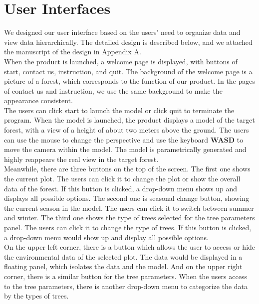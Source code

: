 \documentclass[12pt, titlepage]{article}
\begin{document}
\section{User Interfaces}


We designed our user interface based on the users' need to organize data and view data hierarchically. The detailed design is described below, and we attached the manuscript of the design in Appendix A.\\

\noindent When the product is launched, a welcome page is displayed, with buttons of start, contact us, instruction, and quit. The background of the welcome page is a picture of a forest, which corresponds to the function of our product. In the pages of contact us and instruction, we use the same background to make the appearance consistent. \\

\noindent The users can click start to launch the model or click quit to terminate the program. When the model is launched, the product displays a model of the target forest, with a view of a height of about two meters above the ground. The users can use the mouse to change the perspective and use the keyboard \textbf{WASD} to move the camera within the model. The model is parametrically generated and highly reappears the real view in the target forest. \\

\noindent Meanwhile, there are three buttons on the top of the screen. The first one shows the current plot. The users can click it to change the plot or show the overall data of the forest. If this button is clicked, a drop-down menu shows up and displays all possible options. The second one is seasonal change button, showing the current season in the model. The users can click it to switch between summer and winter. The third one shows the type of trees selected for the tree parameters panel. The users can click it to change the type of trees. If this button is clicked, a drop-down menu would show up and display all possible options. \\

\noindent On the upper left corner, there is a button which allows the user to access or hide the environmental data of the selected plot. The data would be displayed in a floating panel, which isolates the data and the model. And on the upper right corner, there is a similar button for the tree parameters. When the users access to the tree parameters, there is another drop-down menu to categorize the data by the types of trees. \\
\end{document}
